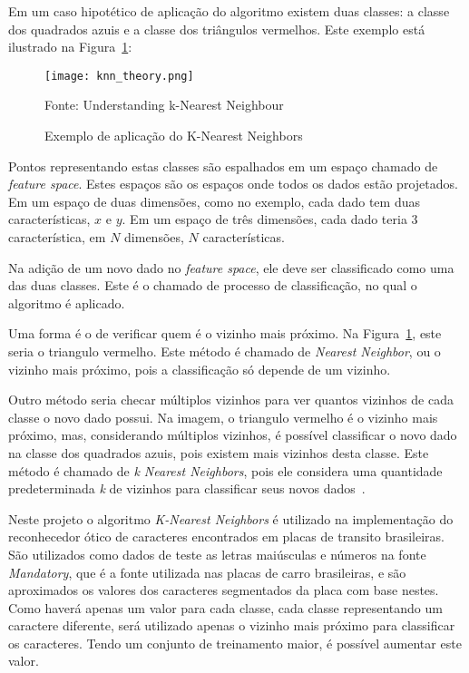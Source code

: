 Em um caso hipotético de aplicação do algoritmo existem duas classes: a classe
dos quadrados azuis e a classe dos triângulos vermelhos. Este exemplo está
ilustrado na Figura~\ref{fig:knearest_example}:

\begin{figure}[H]
	\centering
	\texttt{[image: knn\_theory.png]}
	\caption{Exemplo de aplicação do K-Nearest Neighbors}
Fonte: Understanding k-Nearest Neighbour~\cite{opencv2014knearest}
	\label{fig:knearest_example}
\end{figure}

Pontos representando estas classes são espalhados em um espaço chamado de
\emph{feature space}. Estes espaços são os espaços onde todos os dados estão
projetados. Em um espaço de duas dimensões, como no exemplo, cada dado tem duas
características, $x$ e $y$. Em um espaço de três dimensões, cada dado teria 3
característica, em $N$ dimensões, $N$ características.

Na adição de um novo dado no \emph{feature space}, ele deve ser classificado
como uma das duas classes. Este é o chamado de processo de classificação, no
qual o algoritmo é aplicado.

Uma forma é o de verificar quem é o vizinho mais próximo. Na
Figura~\ref{fig:knearest_example}, este seria o triangulo vermelho. Este método
é chamado de \emph{Nearest Neighbor}, ou o vizinho mais próximo, pois a
classificação só depende de um vizinho.

Outro método seria checar múltiplos vizinhos para ver quantos vizinhos de cada
classe o novo dado possui. Na imagem, o triangulo vermelho é o vizinho mais
próximo, mas, considerando múltiplos vizinhos, é possível classificar o novo
dado na classe dos quadrados azuis, pois existem mais vizinhos desta classe.
Este método é chamado de \emph{k Nearest Neighbors}, pois ele considera uma
quantidade predeterminada \emph{k} de vizinhos para classificar seus novos
dados~\cite{opencv2014knearest}.

Neste projeto o algoritmo \emph{K-Nearest Neighbors} é utilizado na
implementação do reconhecedor ótico de caracteres encontrados em placas de
transito brasileiras. São utilizados como dados de teste as letras maiúsculas e
números na fonte \emph{Mandatory}, que é a fonte utilizada nas placas de carro
brasileiras, e são aproximados os valores dos caracteres segmentados da placa
com base nestes. Como haverá apenas um valor para cada classe, cada classe
representando um caractere diferente, será utilizado apenas o vizinho mais
próximo para classificar os caracteres. Tendo um conjunto de treinamento maior,
é possível aumentar este valor.

